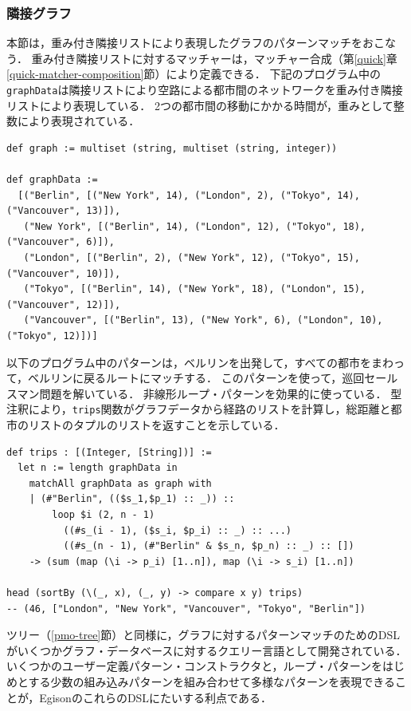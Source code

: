 \subsubsection{隣接グラフ}

本節は，重み付き隣接リストにより表現したグラフのパターンマッチをおこなう．
重み付き隣接リストに対するマッチャーは，マッチャー合成（第\ref{quick}章\ref{quick-matcher-composition}節）により定義できる．
下記のプログラム中の\lstinline{graphData}は隣接リストにより空路による都市間のネットワークを重み付き隣接リストにより表現している．
2つの都市間の移動にかかる時間が，重みとして整数により表現されている．
\begin{lstlisting}[language=egison,numbers=none]
def graph := multiset (string, multiset (string, integer))

def graphData :=
  [("Berlin", [("New York", 14), ("London", 2), ("Tokyo", 14), ("Vancouver", 13)]),
   ("New York", [("Berlin", 14), ("London", 12), ("Tokyo", 18), ("Vancouver", 6)]),
   ("London", [("Berlin", 2), ("New York", 12), ("Tokyo", 15), ("Vancouver", 10)]),
   ("Tokyo", [("Berlin", 14), ("New York", 18), ("London", 15), ("Vancouver", 12)]),
   ("Vancouver", [("Berlin", 13), ("New York", 6), ("London", 10), ("Tokyo", 12)])]
\end{lstlisting}
以下のプログラム中のパターンは，ベルリンを出発して，すべての都市をまわって，ベルリンに戻るルートにマッチする．
このパターンを使って，巡回セールスマン問題を解いている．
非線形ループ・パターンを効果的に使っている．
型注釈により，\lstinline{trips}関数がグラフデータから経路のリストを計算し，総距離と都市のリストのタプルのリストを返すことを示している．
\begin{lstlisting}[language=egison,numbers=none]
def trips : [(Integer, [String])] :=
  let n := length graphData in
    matchAll graphData as graph with
    | (#"Berlin", (($s_1,$p_1) :: _)) ::
        loop $i (2, n - 1)
          ((#s_(i - 1), ($s_i, $p_i) :: _) :: ...)
          ((#s_(n - 1), (#"Berlin" & $s_n, $p_n) :: _) :: [])
    -> (sum (map (\i -> p_i) [1..n]), map (\i -> s_i) [1..n])

head (sortBy (\(_, x), (_, y) -> compare x y) trips)
-- (46, ["London", "New York", "Vancouver", "Tokyo", "Berlin"])
\end{lstlisting}

ツリー（\ref{pmo-tree}節）と同様に，グラフに対するパターンマッチのためのDSLがいくつかグラフ・データベースに対するクエリー言語として開発されている．
いくつかのユーザー定義パターン・コンストラクタと，ループ・パターンをはじめとする少数の組み込みパターンを組み合わせて多様なパターンを表現できることが，EgisonのこれらのDSLにたいする利点である．
